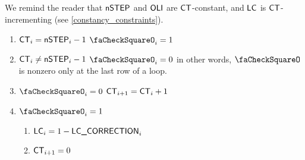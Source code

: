 \begin{center}
\end{center}
We remind the reader that $\textsf{nSTEP}$ and $\textsf{OLI}$ are $\textsf{CT}$-constant, and $\textsf{LC}$ is $\textsf{CT}$-incrementing (see \ref{constancy_constraints}).
\begin{enumerate}
    \item \If $\textsf{CT}_{i} = \textsf{nSTEP}_{i}-1$ \Then $\done_{i} = 1$ 
    \item \If $\textsf{CT}_{i} \ne \textsf{nSTEP}_{i}-1$ \Then $\done_{i} = 0$ in other words, $\done$ is nonzero only at the last row of a loop.
    \item \If $\done_{i} = 0$ \Then $\textsf{CT}_{i + 1} = \textsf{CT}_{i} + 1$
    \item \If $\done_{i} = 1$ \Then 
        \begin{enumerate}
            \item $\textsf{LC}_{i} = 1-\textsf{LC\_CORRECTION}_{i}$
            \item $\textsf{CT}_{i + 1} = 0$
        \end{enumerate}
\end{enumerate}
